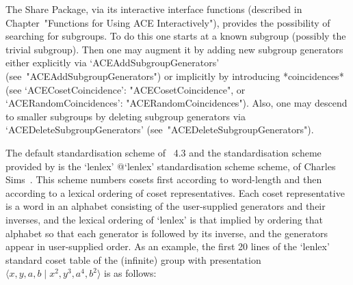 
The  {\ACE}  Share  Package,  via  its  interactive  {\ACE}  interface
functions   (described   in   Chapter~"Functions   for    Using    ACE
Interactively"), provides the possibility of searching for  subgroups.
To do this one starts  at  a  known  subgroup  (possibly  the  trivial
subgroup). Then one may augment it by adding new  subgroup  generators
either        explicitly        via         `ACEAddSubgroupGenerators'
(see~"ACEAddSubgroupGenerators")   or   implicitly   by    introducing
*coincidences*     (see      `ACECosetCoincidence':
"ACECosetCoincidence",           or           `ACERandomCoincidences':
"ACERandomCoincidences"). Also, one may descend to  smaller  subgroups
by  deleting  subgroup  generators  via  `ACEDeleteSubgroupGenerators'
(see~"ACEDeleteSubgroupGenerators").


The   default   standardisation   scheme   of   {\GAP}~4.3   and   the
standardisation    scheme    provided     by     {\ACE}     is     the
`lenlex'{\undoquotes{} {@`lenlex'
standardisation scheme}} scheme, of Charles  Sims~\cite{Sims94}.  This
scheme  numbers  cosets  first  according  to  word-length  and   then
according to a lexical ordering of coset representatives.  Each  coset
representative  is  a  word  in  an   alphabet   consisting   of   the
user-supplied generators and their inverses, and the lexical  ordering
of `lenlex' is that implied by ordering that  alphabet  so  that  each
generator is followed by its inverse, and  the  generators  appear  in
user-supplied order. As an example, the first 20 lines of the `lenlex'
standard  coset  table  of  the  (infinite)  group  with  presentation
$\langle x, y, a, b \mid x^2, y^3, a^4, b^2\rangle$ is as follows:

